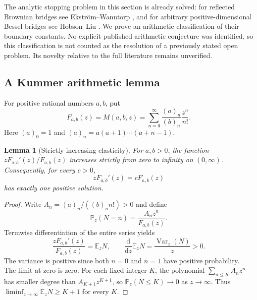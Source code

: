 \documentclass[11pt,a4paper]{article}
\newtheorem{lemma}[theorem]{Lemma}
\theoremstyle{definition}
\theoremstyle{remark}
\numberwithin{equation}{section}
\begin{document}
The analytic stopping problem in this section is already solved: for reflected
Brownian bridges see Ekstr\"om--Wanntorp \cite{p1:EkstromWanntorp2009}, and for
arbitrary positive-dimensional Bessel bridges see Hobson--Liu
\cite{p1:HobsonLiu2026}. We prove an arithmetic classification of their boundary
constants. No explicit published arithmetic conjecture was identified, so this
classification is not counted as the resolution of a previously stated open
problem. Its novelty relative to the full literature remains unverified.

\subsection{A Kummer arithmetic lemma}

For positive rational numbers $a,b$, put
\[
 F_{a,b}(z)=M(a,b,z)
 =\sum_{n=0}^{\infty}\frac{(a)_n}{(b)_n}\frac{z^n}{n!}.
\]
Here $(a)_0=1$ and $(a)_n=a(a+1)\cdots(a+n-1)$.

\begin{lemma}[Strictly increasing elasticity]
\label{p1:lem:kummer-elasticity}
For $a,b>0$, the function $zF_{a,b}'(z)/F_{a,b}(z)$ increases strictly
from zero to infinity on $(0,\infty)$. Consequently, for every $c>0$,
\begin{equation}\label{p1:eq:kummer-boundary}
 zF_{a,b}'(z)=cF_{a,b}(z)
\end{equation}
has exactly one positive solution.
\end{lemma}
\begin{proof}
Write $A_n=(a)_n/((b)_n n!)>0$ and define
\[
 \mathbb P_z(N=n)=\frac{A_nz^n}{F_{a,b}(z)}.
\]
Termwise differentiation of the entire series yields
\[
 \frac{zF_{a,b}'(z)}{F_{a,b}(z)}=\mathbb E_zN,
 \qquad
 \frac{\mathrm d}{\mathrm dz}\mathbb E_zN
 =\frac{\operatorname{Var}_z(N)}{z}>0.
\]
The variance is positive since both $n=0$ and $n=1$ have positive
probability. The limit at zero is zero. For each fixed integer $K$, the
polynomial $\sum_{n\le K}A_nz^n$ has smaller degree than
$A_{K+1}z^{K+1}$, so $\mathbb P_z(N\le K)\to0$ as $z\to\infty$.
Thus $\liminf_{z\to\infty}\mathbb E_zN\ge K+1$ for every $K$.
\end{proof}
\end{document}
